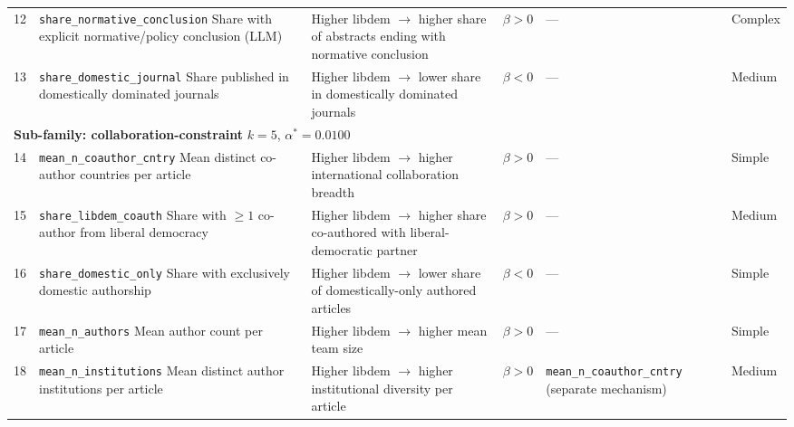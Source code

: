 \documentclass[12pt,a4paper]{article}
\begin{document}
\begin{landscape}
\begin{longtable}{
  @{}
  p{0.6cm}   %
  p{3.6cm}   %
  p{6.0cm}   %
  p{1.4cm}   %
  p{4.0cm}   %
  p{1.2cm}   %
  @{}
}
12 & \texttt{share\_normative\_conclusion} \newline \footnotesize{Share with explicit normative/policy conclusion (LLM)}
   & Higher libdem $\to$ higher share of abstracts ending with normative conclusion
   & $\beta > 0$ & --- & Complex \\[4pt]

13 & \texttt{share\_domestic\_journal} \newline \footnotesize{Share published in domestically dominated journals}
   & Higher libdem $\to$ lower share in domestically dominated journals
   & $\beta < 0$ & --- & Medium \\[10pt]

\multicolumn{6}{l}{\textbf{Sub-family: collaboration-constraint} \quad $k=5$, $\alpha^* = 0.0100$} \\[2pt]

14 & \texttt{mean\_n\_coauthor\_cntry} \newline \footnotesize{Mean distinct co-author countries per article}
   & Higher libdem $\to$ higher international collaboration breadth
   & $\beta > 0$ & --- & Simple \\[4pt]

15 & \texttt{share\_libdem\_coauth} \newline \footnotesize{Share with $\geq 1$ co-author from liberal democracy}
   & Higher libdem $\to$ higher share co-authored with liberal-democratic partner
   & $\beta > 0$ & --- & Medium \\[4pt]

16 & \texttt{share\_domestic\_only} \newline \footnotesize{Share with exclusively domestic authorship}
   & Higher libdem $\to$ lower share of domestically-only authored articles
   & $\beta < 0$ & --- & Simple \\[4pt]

17 & \texttt{mean\_n\_authors} \newline \footnotesize{Mean author count per article}
   & Higher libdem $\to$ higher mean team size
   & $\beta > 0$ & --- & Simple \\[4pt]

18 & \texttt{mean\_n\_institutions} \newline \footnotesize{Mean distinct author institutions per article}
   & Higher libdem $\to$ higher institutional diversity per article
   & $\beta > 0$ & \texttt{mean\_n\_coauthor\_cntry} (separate mechanism) & Medium \\[10pt]


\end{longtable}
\end{landscape}
\end{document}
